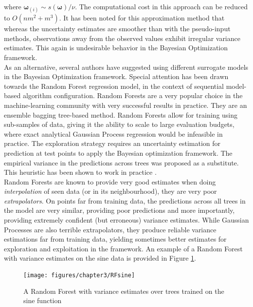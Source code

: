 \documentclass[10pt,a4paper,twoside]{book}
\begin{document}
where $\boldsymbol{\omega}_{(i)} \sim s(\boldsymbol{\omega})/\nu$. The computational cost in this approach can be reduced to $O(nm^2 + m^3)$. It has been noted for this approximation method that whereas the uncertainty estimates are smoother than with the pseudo-input methods, observations away from the observed values exhibit irregular variance estimates. This again is undesirable behavior in the Bayesian Optimization framework.\\

As an alternative, several authors \cite{Hutter2011} have suggested using different surrogate models in the Bayesian Optimization framework. Special attention has been drawn towards the Random Forest regression model, in the context of sequential model-based algorithm configuration. Random Forests \cite{Breiman2001} are a very popular choice in the machine-learning community with very successful results in practice. They are an ensemble bagging tree-based method. Random Forests allow for training using sub-samples of data, giving it the ability to scale to large evaluation budgets, where exact analytical Gaussian Process regression would be infeasible in practice. The exploration strategy requires an uncertainty estimation for prediction at test points to apply the Bayesian optimization framework. The empirical variance in the predictions across trees was proposed as a substitute. This heuristic has been shown to work in practice \cite{Hutter2011}.\\

Random Forests are known to provide very good estimates when doing \textit{interpolation} of seen data (or in its neighbourhood), they are very poor \textit{extrapolators}. On points far from training data, the predictions across all trees in the model are very similar, providing poor predictions and more importantly, providing extremely confident (but erroneous) variance estimates. While Gaussian Processes are also terrible extrapolators, they produce reliable variance estimations far from training data, yielding sometimes better estimates for exploration and exploitation in the framework. An example of a Random Forest with variance estimates on the sine data is provided in Figure \ref{fig:RFsine}.\\

\begin{figure}
\centering
\caption{A Random Forest with variance estimates over trees trained on the sine function}
\texttt{[image: figures/chapter3/RFsine]}
\label{fig:RFsine}
\end{figure}
\end{document}
